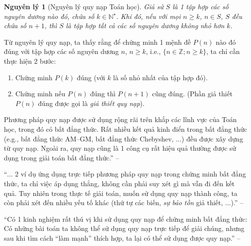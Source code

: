 \documentclass[oneside]{book}
\numberwithin{equation}{section}
\newtheorem{nguyenly}{Nguyên lý}[section]
\begin{document}
\begin{nguyenly}[Nguyên lý quy nạp Toán học]
	Giả sử $S$ là 1 tập hợp các số nguyên dương nào đó, chứa số $k\in\mathbb{N}^\star$. Khi đó, nếu với mọi $n\ge k$, $n\in S$, $S$ đều chứa số $n + 1$, thì $S$ là tập hợp tất cả các số nguyên dương không nhỏ hơn $k$.
\end{nguyenly}
Từ nguyên lý quy nạp, ta thấy rằng để chứng minh 1 mệnh đề $P(n)$ nào đó đúng với tập hợp các số nguyên dương $n$, $n\ge k$, i.e., $\{n\in\mathbb{Z};n\ge k\}$, ta chỉ cần thực hiện 2 bước:
\begin{enumerate}
	\item Chứng minh $P(k)$ đúng (với $k$ là số nhỏ nhất của tập hợp đó).
	\item Chứng minh nếu $P(n)$ đúng thì $P(n+1)$ cũng đúng. (Phần giả thiết $P(n)$ đúng được gọi là \textit{giả thiết quy nạp}).
\end{enumerate}
Phương pháp quy nạp được sử dụng rộng rãi trên khắp các lĩnh vực của Toán học, trong đó có bất đẳng thức. Rất nhiều kết quả kinh điển trong bất đẳng thức (e.g., bất đẳng thức AM--GM, bất đẳng thức Chebyshev, $\ldots$) đều được xây dựng từ quy nạp. Ngoài ra, quy nạp cũng là 1 công cụ rất hiệu quả thường được sử dụng trong giải toán bất đẳng thức.'' -- \cite[p. 136]{TL_chuyen_Toan_Giai_Tich_12}

``$\ldots$ 2 ví dụ ứng dụng trực tiếp phương pháp quy nạp trong chứng minh bất đẳng thức, ta chỉ việc áp dụng thẳng, không cần phải suy xét gì mà vẫn đi đến kết quả. Tuy nhiên trong thực tế giải toán, muốn sử dụng quy nạp thành công, ta còn phải xét đến nhiều yếu tố khác (thứ tự các biến, \textit{sự bảo tồn} giả thiết, $\ldots$).'' -- \cite[p. 138]{TL_chuyen_Toan_Giai_Tich_12}

``Có 1 kinh nghiệm rất thú vị khi sử dụng quy nạp để chứng minh bất đẳng thức: Có những bài toán ta không thể sử dụng quy nạp trực tiếp để giải chúng, nhưng sau khi tìm cách ``làm mạnh'' thích hợp, ta lại có thể sử dụng được quy nạp.'' -- \cite[p. 140]{TL_chuyen_Toan_Giai_Tich_12}
\end{document}
